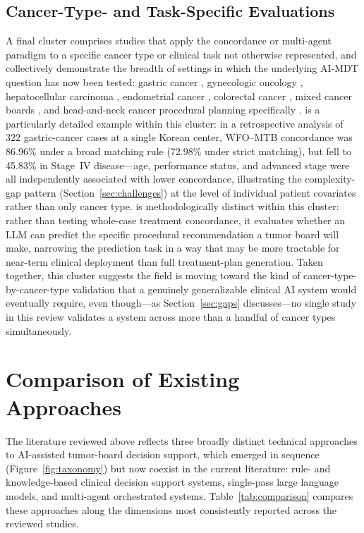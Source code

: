 \documentclass[acmsmall,screen=true,review=false,nonacm=true]{acmart}
\begin{document}
\subsection{Cancer-Type- and Task-Specific Evaluations}
\label{sec:cancer-specific}

A final cluster comprises studies that apply the concordance or multi-agent paradigm to a specific cancer type or clinical task not otherwise represented, and collectively demonstrate the breadth of settings in which the underlying AI-MDT question has now been tested: gastric cancer \citep{park2023}, gynecologic oncology \citep{kuerbanjiang2025}, hepatocellular carcinoma \citep{saenz2026,ciulli2026}, endometrial cancer \citep{aliyev2026}, colorectal cancer \citep{chatziisaak2025}, mixed cancer boards \citep{dogan2025}, and head-and-neck cancer procedural planning specifically \citep{aubreville2024}. \citet{park2023} is a particularly detailed example within this cluster: in a retrospective analysis of 322 gastric-cancer cases at a single Korean center, WFO--MTB concordance was 86.96\% under a broad matching rule (72.98\% under strict matching), but fell to 45.83\% in Stage~IV disease---age, performance status, and advanced stage were all independently associated with lower concordance, illustrating the complexity-gap pattern (Section~\ref{sec:challenges}) at the level of individual patient covariates rather than only cancer type. \citet{aubreville2024} is methodologically distinct within this cluster: rather than testing whole-case treatment concordance, it evaluates whether an LLM can predict the specific procedural recommendation a tumor board will make, narrowing the prediction task in a way that may be more tractable for near-term clinical deployment than full treatment-plan generation. Taken together, this cluster suggests the field is moving toward the kind of cancer-type-by-cancer-type validation that a genuinely generalizable clinical AI system would eventually require, even though---as Section~\ref{sec:gaps} discusses---no single study in this review validates a system across more than a handful of cancer types simultaneously.

\section{Comparison of Existing Approaches}
\label{sec:comparison}

The literature reviewed above reflects three broadly distinct technical approaches to AI-assisted tumor-board decision support, which emerged in sequence (Figure~\ref{fig:taxonomy}) but now coexist in the current literature: rule- and knowledge-based clinical decision support systems, single-pass large language models, and multi-agent orchestrated systems. Table~\ref{tab:comparison} compares these approaches along the dimensions most consistently reported across the reviewed studies.
\end{document}
